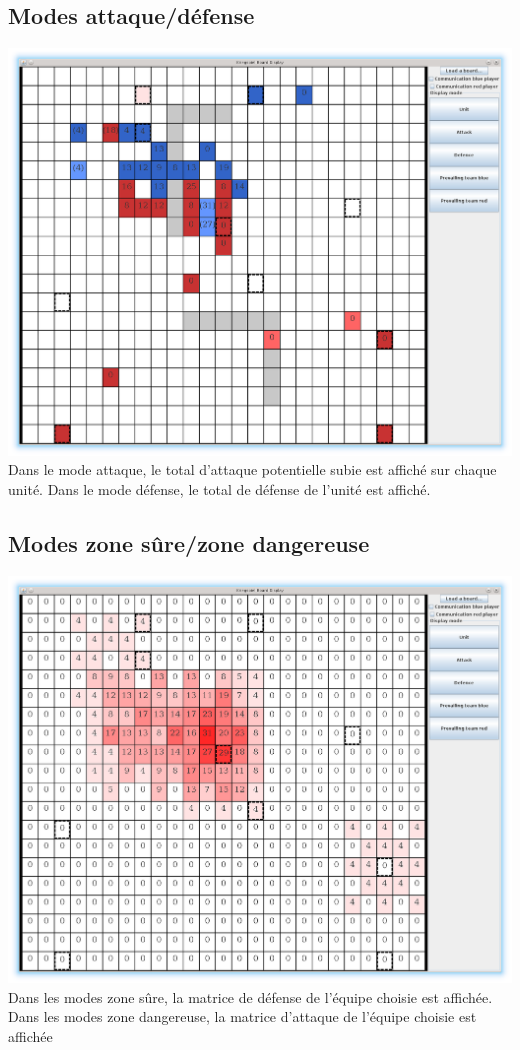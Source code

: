 		\subsection{Modes attaque/défense}
			\includegraphics[scale=0.4]{images/screen2.eps}
			Dans le mode attaque, le total d'attaque potentielle subie est affiché sur chaque unité.
			Dans le mode défense, le total de défense de l'unité est affiché.
		
			\clearpage	

		\subsection{Modes zone sûre/zone dangereuse}
			\includegraphics[scale=0.4]{images/screen3.eps}
			Dans les modes zone sûre, la matrice de défense de l'équipe choisie est affichée.
			Dans les modes zone dangereuse, la matrice d'attaque de l'équipe choisie est affichée


